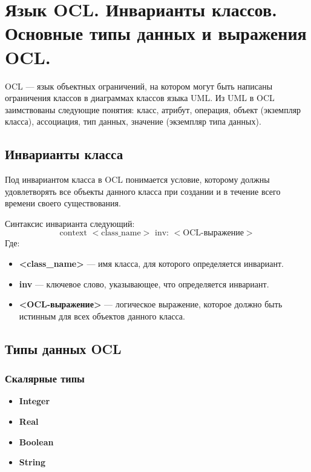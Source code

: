 \documentclass[a4paper,12pt]{article}
\begin{document}
\section{Язык OCL. Инварианты классов. Основные типы данных и выражения OCL.}

OCL — язык объектных ограничений, на котором могут быть написаны ограничения классов в диаграммах классов языка UML. Из UML в OCL заимствованы следующие понятия: класс, атрибут, операция, объект (экземпляр класса), ассоциация, тип данных, значение (экземпляр типа данных).

\subsection{Инварианты класса}

Под инвариантом класса в OCL понимается условие, которому должны удовлетворять все объекты данного класса при создании и в течение всего времени своего существования.

Синтаксис инварианта следующий:
\[
\text{context } <\text{class\_name}> \text{ inv: } <\text{OCL-выражение}>
\]
Где:
\begin{itemize}
    \item \textbf{<class\_name>} — имя класса, для которого определяется инвариант.
    \item \textbf{inv} — ключевое слово, указывающее, что определяется инвариант.
    \item \textbf{<OCL-выражение>} — логическое выражение, которое должно быть истинным для всех объектов данного класса.
\end{itemize}

\subsection{Типы данных OCL}

\subsubsection{Скалярные типы}
\begin{itemize}
    \item \textbf{Integer}
    \item \textbf{Real}
    \item \textbf{Boolean}
    \item \textbf{String}
\end{itemize}
\end{document}
